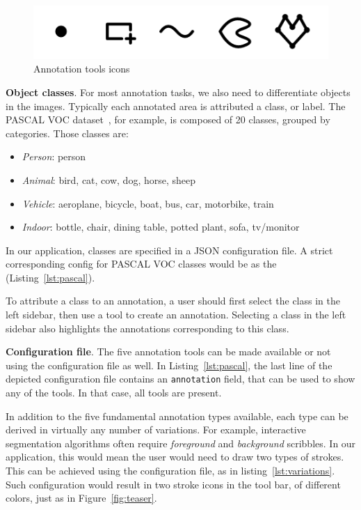 \begin{figure}[ht]
\centering
\includegraphics[width=0.8\columnwidth]{img/annotation-tools.png}
\caption{Annotation tools icons}%
\label{fig:icons}
\end{figure}


\textbf{Object classes}.
For most annotation tasks, we also need to differentiate objects in the images.
Typically each annotated area is attributed a class, or label.
The PASCAL VOC dataset~\cite{everingham2010pascal}, for example,
is composed of 20 classes, grouped by categories. Those classes are:
\begin{itemize}
\item \textit{Person}: person
\item \textit{Animal}: bird, cat, cow, dog, horse, sheep
\item \textit{Vehicle}: aeroplane, bicycle, boat, bus, car, motorbike, train
\item \textit{Indoor}: bottle, chair, dining table, potted plant, sofa, tv/monitor
\end{itemize}

In our application, classes are specified in a JSON configuration file.
A strict corresponding config for PASCAL VOC classes
would be as the (Listing~\ref{lst:pascal}).



To attribute a class to an annotation,
a user should first select the class in the left sidebar,
then use a tool to create an annotation.
Selecting a class in the left sidebar also highlights the annotations
corresponding to this class.


\textbf{Configuration file}.
The five annotation tools can be made available or not
using the configuration file as well.
In Listing~\ref{lst:pascal}, the last line of the depicted configuration file
contains an \texttt{annotation} field, that can be used to show any of the tools.
In that case, all tools are present.

In addition to the five fundamental annotation types available,
each type can be derived in virtually any number of variations.
For example, interactive segmentation algorithms often require
\textit{foreground} and \textit{background} scribbles.
In our application, this would mean the user would need to draw two types of strokes.
This can be achieved using the configuration file,
as in listing~\ref{lst:variations}.
Such configuration would result in two stroke icons in the tool bar,
of different colors, just as in Figure~\ref{fig:teaser}.




